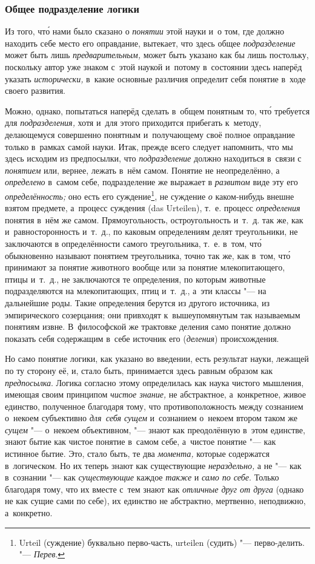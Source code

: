 \subsubsection{Общее подразделение логики}
Из того, чт\'{о} нами было сказано о
{\em понятии} этой науки и~о том, где должно находить
себе место его оправдание, вытекает, что здесь общее
{\em подразделение} может быть лишь
{\em предварительным,} может быть указано как бы лишь
постольку, поскольку автор уже знаком с~этой наукой и~потому в~состоянии
здесь наперёд указать {\em исторически,} в~какие
основные различия определит себя понятие в~ходе своего развития.

Можно, однако, попытаться наперёд сделать в~общем понятным то, чт\'{о} требуется
для {\em подразделения,} хотя и~для этого приходится
прибегать к~методу, делающемуся совершенно понятным и~получающему своё
полное оправдание только в~рамках самой науки. Итак, прежде всего следует
напомнить, что мы здесь исходим из предпосылки, что
{\em подразделение} должно находиться в~связи с
{\em понятием} или, вернее, лежать в~нём самом. Понятие
не неопределённо, а {\em определено} в~самом себе,
подразделение же выражает в {\em развитом} виде эту его
{\em определённость;} оно есть его суждение\footnote{
Urteil (суждение) буквально перво-часть, urteilen (судить) "--- перво-делить.
"--- {\em Перев}.}, не суждение {\em о} каком-нибудь
внешне взятом предмете, а~процесс суждения (das Urteilen), т.~е. процесс
{\em определения} понятия в~нём же самом.
Прямоугольность, остроугольность и~т.~д. так же, как и~равносторонность
и~т.~д., по каковым определениям делят треугольники, не заключаются в
определённости самого треугольника, т.~е. в~том, чт\'{о} обыкновенно называют
понятием треугольника, точно так же, как в~том, чт\'{о} принимают за понятие
животного вообще или за понятие млекопитающего, птицы и~т.~д., не
заключаются те определения, по которым животные подразделяются на
млекопитающих, птиц и~т.~д., а~эти классы "--- на дальнейшие роды. Такие
определения берутся из другого источника, из эмпирического созерцания; они
привходят к~вышеупомянутым так называемым понятиям извне. В~философской же
трактовке деления само понятие должно показать себя содержащим в~себе
источник его ({\em деления}) происхождения.

Но само понятие логики, как указано во введении, есть результат науки,
лежащей по ту сторону её, и, стало быть, принимается здесь равным образом
как {\em предпосылка}. Логика согласно этому
определилась как наука чистого мышления, имеющая своим принципом
{\em чистое знание,} не абстрактное, а~конкретное,
живое единство, полученное благодаря тому, что
противоположность между сознанием о~некоем субъективно {\em для~себя сущем}
и~сознанием о~некоем втором таком же {\em сущем} "--- о~некоем
объективном, "--- знают как преодолённую в~этом единстве, знают бытие как
чистое понятие в~самом себе, а~чистое понятие "--- как истинное бытие.
Это, стало быть, те два
{\em момента,} которые содержатся в~логическом. Но их теперь знают как
существующие {\em нераздельно,} а
не "--- как в~сознании "--- как {\em существующие} каждое {\em также} и
{\em само по себе}. Только благодаря тому, что их вместе с~тем знают как
{\em отличные друг от друга} (однако не как сущие сами по
себе), их единство не абстрактно, мертвенно, неподвижно, а~конкретно.

